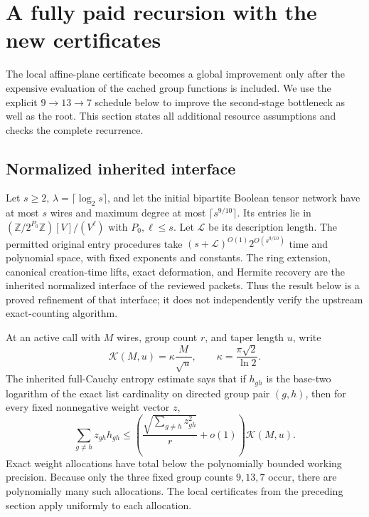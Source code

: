 \section{A fully paid recursion with the new certificates}
\label{sec:schedule}

The local affine-plane certificate becomes a global improvement only after
the expensive evaluation of the cached group functions is included. We use the explicit $9\to13\to7$ schedule below to improve the
second-stage bottleneck as well as the root. This section states all additional
resource assumptions and checks the complete recurrence.

\subsection{Normalized inherited interface}

Let $s\ge2$, $\lambda=\lceil\log_2s\rceil$, and let the initial
bipartite Boolean tensor network have at most $s$ wires and maximum degree
at most $\lceil s^{9/10}\rceil$. Its entries lie in
$(\mathbb Z/2^{P_0}\mathbb Z)[V]/(V^\ell)$ with $P_0,\ell\le s$.
Let $\mathcal L$ be its description length. The permitted original entry
procedures take $(s+\mathcal L)^{O(1)}2^{O(s^{9/10})}$ time and polynomial
space, with fixed exponents and constants. The ring extension, canonical
creation-time lifts, exact deformation, and Hermite recovery are the
inherited normalized interface of the reviewed packets. Thus the result
below is a proved refinement of that interface; it does not independently
verify the upstream exact-counting algorithm.

At an active call with $M$ wires, group count $r$, and taper length $u$,
write
\[
 \mathcal K(M,u)=\kappa\frac{M}{\sqrt u},\qquad
 \kappa=\frac{\pi\sqrt2}{\ln2}.
\]
The inherited full-Cauchy entropy estimate says that if $h_{gh}$ is the
base-two logarithm of the exact list cardinality on directed group pair
$(g,h)$, then for every fixed nonnegative weight vector $z$,
\[
 \sum_{g\ne h}z_{gh}h_{gh}
 \le\left(\frac{\sqrt{\sum_{g\ne h}z_{gh}^2}}r+o(1)\right)
       \mathcal K(M,u).
\]
Exact weight allocations have total below the polynomially bounded working
precision. Because only the three fixed group counts $9,13,7$ occur, there
are polynomially many such allocations. The local certificates from the
preceding section apply uniformly to each allocation.

